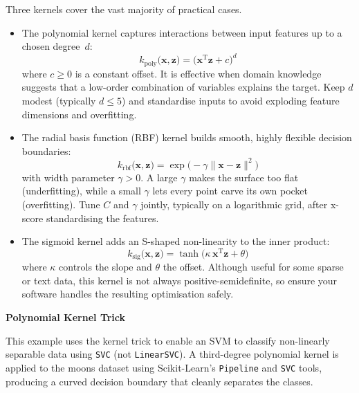 \documentclass[12pt,letter]{article}
\begin{document}
Three kernels cover the vast majority of practical cases. 
\begin{itemize}
\item The polynomial kernel captures interactions between input features up to a chosen degree~$d$:
\begin{equation}
k_{\text{poly}}\bigl(\textbf{x},\textbf{z}\bigr)
  = \bigl(\textbf{x}^{\text{T}}\textbf{z} + c\bigr)^{d}
\end{equation}
where $c\!\ge\!0$ is a constant offset.  It is effective when domain knowledge suggests that a low-order combination of variables explains the target.  Keep $d$ modest (typically $d\le5$) and standardise inputs to avoid exploding feature dimensions and overfitting.
\item The radial basis function (RBF) kernel builds smooth, highly flexible decision boundaries:
\begin{equation}
k_{\text{rbf}}\bigl(\textbf{x},\textbf{z}\bigr)
  = \exp\!\bigl(-\gamma \lVert \textbf{x}-\textbf{z}\rVert^{2}\bigr)
\end{equation}
with width parameter $\gamma>0$.  A large $\gamma$ makes the surface too flat (underfitting), while a small $\gamma$ lets every point carve its own pocket (overfitting).  Tune $C$ and $\gamma$ jointly, typically on a logarithmic grid, after x-score standardising the features.
\item The sigmoid kernel adds an S-shaped non-linearity to the inner product:
\begin{equation}
k_{\text{sig}}\bigl(\textbf{x},\textbf{z}\bigr)
  = \tanh\!\bigl(\kappa\,\textbf{x}^{\text{T}}\textbf{z} + \theta\bigr)
\end{equation}
where $\kappa$ controls the slope and $\theta$ the offset.  Although useful for some sparse or text data, this kernel is not always positive-semidefinite, so ensure your software handles the resulting optimisation safely.
\end{itemize}

\begin{example}
\textbf{Polynomial Kernel Trick}

\noindent This example uses the kernel trick to enable an SVM to classify non-linearly separable data using \texttt{SVC} (not \texttt{LinearSVC}). A third-degree polynomial kernel is applied to the moons dataset using Scikit-Learn's \texttt{Pipeline} and \texttt{SVC} tools, producing a curved decision boundary that cleanly separates the classes.
\end{example}
\end{document}
